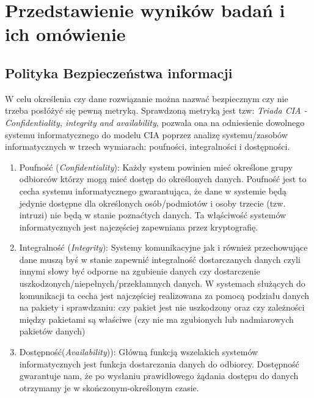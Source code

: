 \section{Przedstawienie wyników badań i ich omówienie}

\subsection{Polityka Bezpieczeństwa informacji}

W celu określenia czy dane rozwiązanie można nazwać bezpiecznym czy nie trzeba posłóżyć się pewną metryką. Sprawdzoną metryką jest tzw: \textit{Triada CIA - Confidentiality, integrity and availability}, pozwala ona na odniesienie dowolnego systemu informatycznego do modelu CIA poprzez analizę systemu/zasobów informatycznych w trzech wymiarach: poufności, integralności i dostępności.

\begin{enumerate}
	\item Poufność (\textit{Confidentiality}): Każdy system powinien mieć określone grupy odbiorców którzy mogą mieć dostęp do określonych danych. Poufność jest to cecha systemu informatycznego gwarantująca, że dane w systemie będą jedynie dostępne dla określonych osób/podmiotów i osoby trzecie (tzw. intruzi) nie będą w stanie poznaćtych danych. Ta włąściwość systemów informatycznych jest najczęściej zapewniana przez kryptografię.
	\item Integralność (\textit{Integrity}): Systemy komunikacyjne jak i również przechowujące dane muszą byś w stanie zapewnić integralność dostarczanych danych czyli innymi słowy być odporne na zgubienie danych czy dostarczenie uszkodzonych/niepełnych/przekłamnych danych. W systemach służących do komunikacji ta cecha jest najczęściej realizowana za pomocą podziału danych na pakiety i sprawdzaniu: czy pakiet jest nie uszkodzony oraz czy zależności między pakietami są właściwe (czy nie ma zgubionych lub nadmiarowych pakietów danych)
	\item Dostępność(\textit{Availability})): Główną funkcją wszelakich systemów informatycznych jest funkcja dostarczania danych do odbiorcy. Dostępność gwarantuje nam, że po wysłaniu prawidłowego żądania dostępu do danych otrzymamy je w skończonym-określonym czasie.
\end{enumerate}

